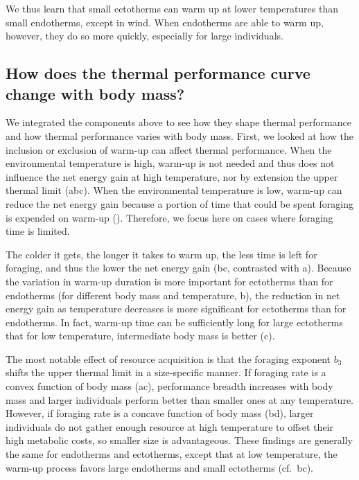 We thus learn that small ectotherms can warm up at lower temperatures than small endotherms, except in wind.
When endotherms are able to warm up, however, they do so more quickly, especially for large individuals.


\subsection*{How does the thermal performance curve change with body mass?}

We integrated the components above to see how they shape thermal performance and how thermal performance varies with body mass.
First, we looked at how the inclusion or exclusion of warm-up can affect thermal performance.
When the environmental temperature is high, warm-up is not needed and thus does not influence the net energy gain at high temperature, nor by extension the upper thermal limit (abc).
When the environmental temperature is low, warm-up can reduce the net energy gain because a portion of time that could be spent foraging is expended on warm-up ().
Therefore, we focus here on cases where foraging time is limited.

The colder it gets, the longer it takes to warm up, the less time is left for foraging, and thus the lower the net energy gain (bc, contrasted with a).
Because the variation in warm-up duration is more important for ectotherms than for endotherms (for different body mass and temperature, b), the reduction in net energy gain as temperature decreases is more significant for ectotherms than for endotherms.
In fact, warm-up time can be sufficiently long for large ectotherms that for low temperature, intermediate body mass is better (c).

The most notable effect of resource acquisition is that the foraging exponent $b_3$ shifts the upper thermal limit in a size-specific manner.
If foraging rate is a convex function of body mass (ac), performance breadth increases with body mass and larger individuals perform better than smaller ones at any temperature.
However, if foraging rate is a concave function of body mass (bd), larger individuals do not gather enough resource at high temperature to offset their high metabolic costs, so smaller size is advantageous.
These findings are generally the same for endotherms and ectotherms, except that at low temperature, the warm-up process favors large endotherms and small ectotherms (cf.~bc).

